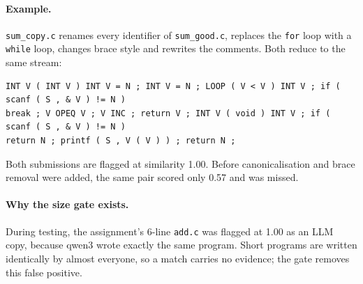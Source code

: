 \documentclass[11pt,a4paper]{article}
\newcommand{\file}[1]{\nolinkurl{#1}}
\begin{document}
\paragraph{Example.} \file{sum_copy.c} renames every identifier of \file{sum_good.c}, replaces the
\texttt{for} loop with a \texttt{while} loop, changes brace style and rewrites the comments. Both reduce to the same stream:
\begin{lstlisting}
INT V ( INT V ) INT V = N ; INT V = N ; LOOP ( V < V ) INT V ; if ( scanf ( S , & V ) != N )
break ; V OPEQ V ; V INC ; return V ; INT V ( void ) INT V ; if ( scanf ( S , & V ) != N )
return N ; printf ( S , V ( V ) ) ; return N ;
\end{lstlisting}
Both submissions are flagged at similarity 1.00. Before canonicalisation and brace removal were added, the
same pair scored only 0.57 and was missed.

\paragraph{Why the size gate exists.} During testing, the assignment's 6-line \texttt{add.c} was flagged at 1.00 as an
LLM copy, because qwen3 wrote exactly the same program. Short programs are written identically by almost
everyone, so a match carries no evidence; the gate removes this false positive.

\end{document}
